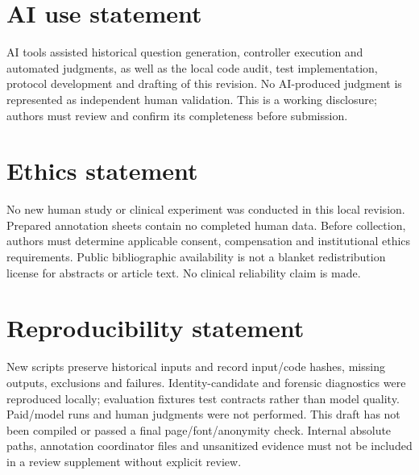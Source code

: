 \documentclass{article}
\begin{document}
\section*{AI use statement}
AI tools assisted historical question generation, controller execution and
automated judgments, as well as the local code audit, test implementation,
protocol development and drafting of this revision. No AI-produced judgment is
represented as independent human validation. This is a working disclosure;
authors must review and confirm its completeness before submission.

\section*{Ethics statement}
No new human study or clinical experiment was conducted in this local revision.
Prepared annotation sheets contain no completed human data. Before collection,
authors must determine applicable consent, compensation and institutional ethics
requirements. Public bibliographic availability is not a blanket redistribution
license for abstracts or article text. No clinical reliability claim is made.

\section*{Reproducibility statement}
New scripts preserve historical inputs and record input/code hashes, missing
outputs, exclusions and failures. Identity-candidate and forensic diagnostics
were reproduced locally; evaluation fixtures test contracts rather than model
quality. Paid/model runs and human judgments were not performed. This draft has
not been compiled or passed a final page/font/anonymity check. Internal absolute
paths, annotation coordinator files and unsanitized evidence must not be included
in a review supplement without explicit review.



\end{document}
